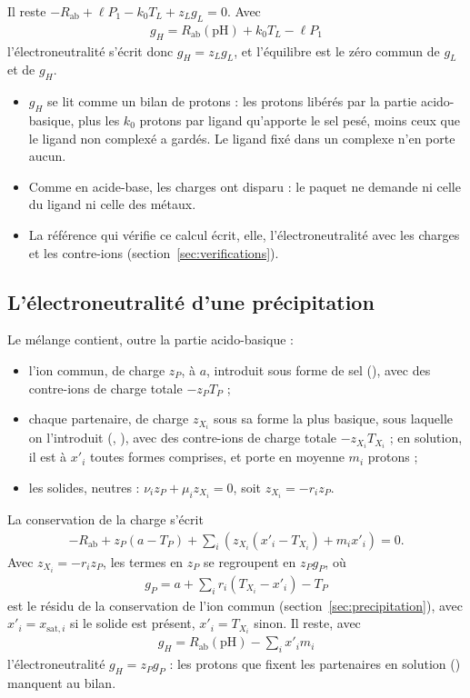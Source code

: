 \documentclass[a4paper,11pt]{article}
\newcommand\rmxcons[1]{\begin{tcolorbox}[rmq, rouge, left=3pt, fontupper=\small\itshape]\begin{itemize}[label=\ding{43}, leftmargin=*, topsep=0pt, itemsep=2pt]#1\end{itemize}\end{tcolorbox}}
\newcommand\rsltm[1]{\boxed{#1}}
\newcommand\pH{\ensuremath{\mathrm{pH}}\xspace}
\newcommand\pare[1]{\left(#1\right)}
\begin{document}
Il reste $-R_\text{ab}+\ell P_1-k_0T_L+z_Lg_L=0$.
Avec
\begin{align}
\rsltm{g_H=R_\text{ab}(\pH)+k_0T_L-\ell P_1}
\end{align}
l'électroneutralité s'écrit donc $g_H=z_Lg_L$, et l'équilibre est le zéro commun de $g_L$ et de $g_H$.
\rmxcons{
\item $g_H$ se lit comme un bilan de protons : les protons libérés par la partie acido-basique, plus les $k_0$ protons par ligand qu'apporte le sel pesé, moins ceux que le ligand non complexé a gardés.
Le ligand fixé dans un complexe n'en porte aucun.
\item Comme en acide-base, les charges ont disparu : le paquet ne demande ni celle du ligand ni celle des métaux.
\item La référence qui vérifie ce calcul écrit, elle, l'électroneutralité avec les charges et les contre-ions (section~\ref{sec:verifications}).
}

\subsection{L'électroneutralité d'une précipitation}
Le mélange contient, outre la partie acido-basique :
\begin{itemize}
\item l'ion commun, de charge $z_P$, à $a$, introduit sous forme de sel (), avec des contre-ions de charge totale $-z_PT_P$ ;
\item chaque partenaire, de charge $z_{X_i}$ sous sa forme la plus basique, sous laquelle on l'introduit (, ), avec des contre-ions de charge totale $-z_{X_i}T_{X_i}$ ; en solution, il est à $x'_i$ toutes formes comprises, et porte en moyenne $m_i$ protons ;
\item les solides, neutres : $\nu_iz_P+\mu_iz_{X_i}=0$, soit $z_{X_i}=-r_iz_P$.
\end{itemize}
La conservation de la charge s'écrit
\begin{align}
-R_\text{ab}+z_P\pare{a-T_P}+\sum_i\pare{z_{X_i}\pare{x'_i-T_{X_i}}+m_ix'_i}=0.
\end{align}
Avec $z_{X_i}=-r_iz_P$, les termes en $z_P$ se regroupent en $z_Pg_P$, où
\begin{align}
\rsltm{g_P=a+\sum_ir_i\pare{T_{X_i}-x'_i}-T_P}
\end{align}
est le résidu de la conservation de l'ion commun (section~\ref{sec:precipitation}), avec $x'_i=x_{\text{sat},i}$ si le solide est présent, $x'_i=T_{X_i}$ sinon.
Il reste, avec
\begin{align}
\rsltm{g_H=R_\text{ab}(\pH)-\sum_ix'_im_i}
\end{align}
l'électroneutralité $g_H=z_Pg_P$ : les protons que fixent les partenaires en solution () manquent au bilan.
\end{document}
